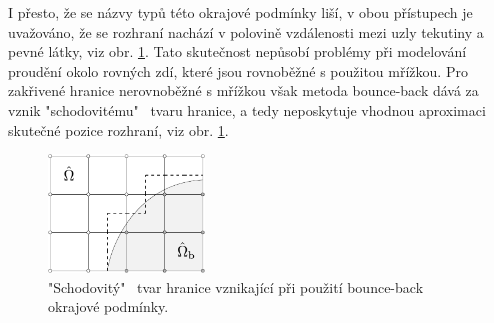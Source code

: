 I přesto, že se názvy typů této okrajové podmínky liší, v obou přístupech je uvažováno, že se rozhraní nachází v polovině vzdálenosti mezi uzly tekutiny a pevné látky, viz obr. \ref{fig:staircase}. Tato skutečnost nepůsobí problémy při modelování proudění okolo rovných zdí, které jsou rovnoběžné s použitou mřížkou. Pro zakřivené hranice nerovnoběžné s mřížkou však metoda bounce-back dává za vznik "schodovitému" \ tvaru hranice, a tedy neposkytuje vhodnou aproximaci skutečné pozice rozhraní, viz obr. \ref{fig:staircase}.
\begin{figure}[H]
	\centering
	\vspace{2mm}
	\includegraphics[width=0.37\textwidth]{Images/stairboundary.pdf}
	\vspace{2mm}
	\caption{"Schodovitý" \ tvar hranice vznikající při použití bounce-back okrajové podmínky.}
	\label{fig:staircase}
	\vspace{1.8mm}
\end{figure}

